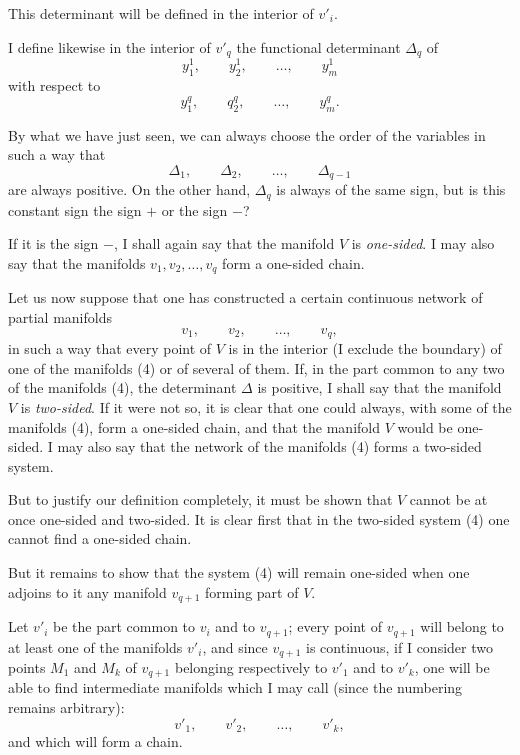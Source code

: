\documentclass{article}
\begin{document}
This determinant will be defined in the interior of $v'_{i}$.

I define likewise in the interior of $v'_{q}$ the functional determinant $\Delta_{q}$ of
\[
y^{1}_{1}, \qquad y^{1}_{2}, \qquad \ldots, \qquad y^{1}_{m}
\]
with respect to
\[
y^{q}_{1}, \qquad q^{q}_{2}, \qquad \ldots, \qquad y^{q}_{m}.
\]

By what we have just seen, we can always choose the order of the variables in such a way that
\[
\Delta_{1}, \qquad \Delta_{2}, \qquad \ldots, \qquad \Delta_{q-1}
\]
are always positive. On the other hand, $\Delta_{q}$ is always of the same sign, but is this constant sign the sign $+$ or the sign $-$?

If it is the sign $-$, I shall again say that the manifold $V$ is \emph{one-sided}. I may also say that the manifolds $v_{1}, v_{2}, \ldots, v_{q}$ form a one-sided chain.

Let us now suppose that one has constructed a certain continuous network of partial manifolds
\[
v_{1}, \qquad v_{2}, \qquad \ldots, \qquad v_{q}, \tag{4}
\]
in such a way that every point of $V$ is in the interior (I exclude the boundary) of one of the manifolds (4) or of several of them. If, in the part common to any two of the manifolds (4), the determinant $\Delta$ is positive, I shall say that the manifold $V$ is \emph{two-sided}. If it were not so, it is clear
that one could always, with some of the manifolds (4), form a one-sided chain, and that the manifold $V$ would be one-sided. I may also say that the network of the manifolds (4) forms a two-sided system.

But to justify our definition completely, it must be shown that $V$ cannot be at once one-sided and two-sided. It is clear first that in the two-sided system (4) one cannot find a one-sided chain.

But it remains to show that the system (4) will remain one-sided when one adjoins to it any manifold $v_{q+1}$ forming part of $V$.

Let $v'_{i}$ be the part common to $v_{i}$ and to $v_{q+1}$; every point of $v_{q+1}$ will belong to at least one of the manifolds $v'_{i}$, and since $v_{q+1}$ is continuous, if I consider two points $M_{1}$ and $M_{k}$ of $v_{q+1}$ belonging respectively to $v'_{1}$ and to $v'_{k}$, one will be able to find intermediate manifolds which I may call (since the numbering remains arbitrary):
\[
v'_{1}, \qquad v'_{2}, \qquad \ldots, \qquad v'_{k},
\]
and which will form a chain.
\end{document}
